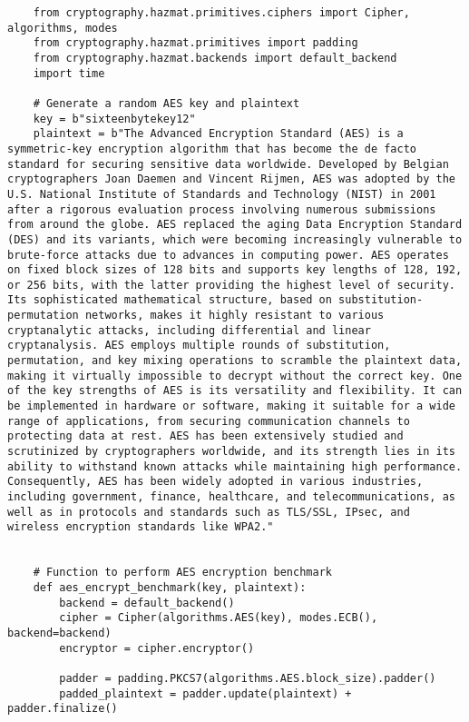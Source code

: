 \begin{listing}
    \begin{verbatim}
    from cryptography.hazmat.primitives.ciphers import Cipher, algorithms, modes
    from cryptography.hazmat.primitives import padding
    from cryptography.hazmat.backends import default_backend
    import time

    # Generate a random AES key and plaintext
    key = b"sixteenbytekey12"
    plaintext = b"The Advanced Encryption Standard (AES) is a symmetric-key encryption algorithm that has become the de facto standard for securing sensitive data worldwide. Developed by Belgian cryptographers Joan Daemen and Vincent Rijmen, AES was adopted by the U.S. National Institute of Standards and Technology (NIST) in 2001 after a rigorous evaluation process involving numerous submissions from around the globe. AES replaced the aging Data Encryption Standard (DES) and its variants, which were becoming increasingly vulnerable to brute-force attacks due to advances in computing power. AES operates on fixed block sizes of 128 bits and supports key lengths of 128, 192, or 256 bits, with the latter providing the highest level of security. Its sophisticated mathematical structure, based on substitution-permutation networks, makes it highly resistant to various cryptanalytic attacks, including differential and linear cryptanalysis. AES employs multiple rounds of substitution, permutation, and key mixing operations to scramble the plaintext data, making it virtually impossible to decrypt without the correct key. One of the key strengths of AES is its versatility and flexibility. It can be implemented in hardware or software, making it suitable for a wide range of applications, from securing communication channels to protecting data at rest. AES has been extensively studied and scrutinized by cryptographers worldwide, and its strength lies in its ability to withstand known attacks while maintaining high performance. Consequently, AES has been widely adopted in various industries, including government, finance, healthcare, and telecommunications, as well as in protocols and standards such as TLS/SSL, IPsec, and wireless encryption standards like WPA2."


    # Function to perform AES encryption benchmark
    def aes_encrypt_benchmark(key, plaintext):
        backend = default_backend()
        cipher = Cipher(algorithms.AES(key), modes.ECB(), backend=backend)
        encryptor = cipher.encryptor()

        padder = padding.PKCS7(algorithms.AES.block_size).padder()
        padded_plaintext = padder.update(plaintext) + padder.finalize()


\end{verbatim}
\end{listing}
